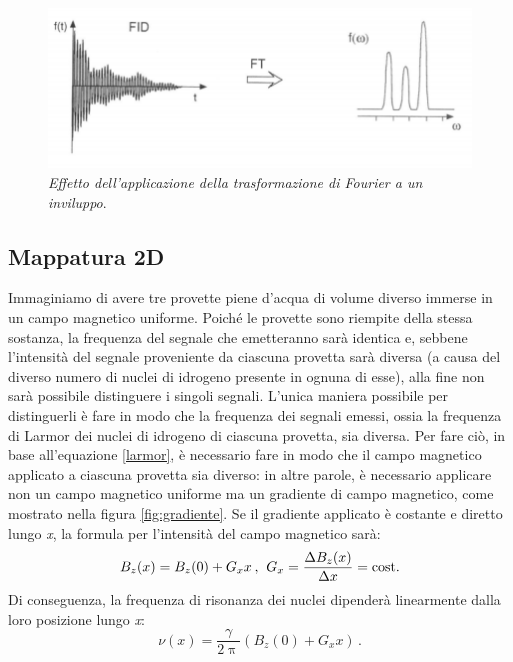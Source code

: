 \documentclass{report}
\newcommand{\figref}[1]{figura \ref{#1}}
\renewcommand{\eqref}[1]{equazione \ref{#1}}
\numberwithin{equation}{section}
\numberwithin{figure}{section}
\begin{document}
\begin{figure}[htp]
\centering
\includegraphics[scale=0.66]{immagini/fourier.png}
\caption{\label{fig:fourier} \textit{Effetto dell'applicazione della trasformazione di Fourier a un inviluppo}.}
\end{figure}

\subsection{Mappatura 2D}
Immaginiamo di avere tre provette piene d'acqua di volume diverso immerse in un campo magnetico uniforme. Poiché le provette sono riempite della stessa sostanza, la frequenza del segnale che emetteranno sarà identica e, sebbene l'intensità del segnale proveniente da ciascuna provetta sarà diversa (a causa del diverso numero di nuclei di idrogeno presente in ognuna di esse), alla fine non sarà possibile distinguere i singoli segnali. L'unica maniera possibile per distinguerli è fare in modo che la frequenza dei segnali emessi, ossia la frequenza di Larmor dei nuclei di idrogeno di ciascuna provetta, sia diversa. Per fare ciò, in base all'\eqref{larmor}, è necessario fare in modo che il campo magnetico applicato a ciascuna provetta sia diverso: in altre parole, è necessario applicare non un campo magnetico uniforme ma un gradiente di campo magnetico, come mostrato nella \figref{fig:gradiente}. Se il gradiente applicato è costante e diretto lungo \textit{x}, la formula per l'intensità del campo magnetico sarà:
\begin{equation}
    B_z(x)=B_z(0)+G_xx \hspace{2 pt}, \hspace{4 pt} G_x=\frac{\Delta B_z(x)}{\Delta x}=\mathrm{cost.}
\end{equation}
Di conseguenza, la frequenza di risonanza dei nuclei dipenderà linearmente dalla loro posizione lungo \textit{x}:
\begin{equation}
    \nu (x)= \frac{\gamma}{2\uppi}(B_z(0)+G_xx) \,.
\end{equation}
\end{document}
